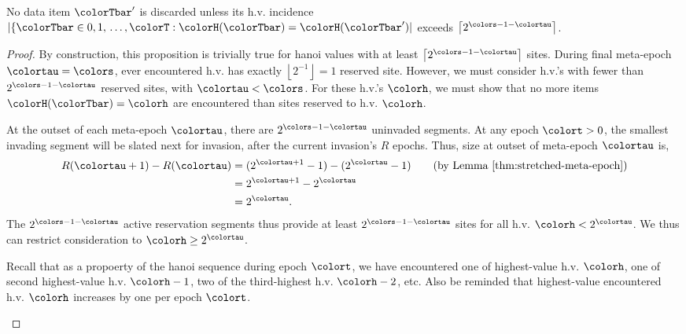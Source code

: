 \begin{lemma}
\label{thm:stretched-discarded-incidence-count}
No data item $\colorTbar'$ is discarded unless its h.v. incidence $|\{\colorTbar \in 0,1,\,\ldots,\colorT : \colorH(\colorTbar) = \colorH(\colorTbar')|$ exceeds $\left\lceil2^{\colors - 1 - \colortau}\right\rceil$.
\end{lemma}

\begin{proof}
By construction, this proposition is trivially true for hanoi values with at least $\left\lceil 2^{\colors-1-\colortau} \right\rceil$ sites.
During final meta-epoch $\colortau = \colors$, ever encountered h.v. has exactly $\left\lfloor 2^{-1} \right\rfloor = 1$ reserved site.
However, we must consider h.v.'s with fewer than $2^{\colors-1-\colortau}$ reserved sites, with $\colortau < \colors$.
For these h.v.'s $\colorh$, we must show that no more items $\colorH(\colorTbar) = \colorh$ are encountered than sites reserved to h.v. $\colorh$.

\begin{proofpart}

At the outset of each meta-epoch $\colortau$, there are $2^{\colors - 1 - \colortau}$ uninvaded segments.
At any epoch $\colort>0$, the smallest invading segment will be slated next for invasion, after the current invasion's $R$ epochs.
Thus, size at outset of meta-epoch $\colortau$ is,
\begin{align*}
R(\colortau + 1) - R(\colortau)
&= (2^{\colortau + 1} - 1) - (2^{\colortau} - 1) \tag{by Lemma \ref{thm:stretched-meta-epoch}}\\
&= 2^{\colortau + 1} - 2^{\colortau}\\
&= 2^{\colortau}.
\end{align*}
The $2^{\colors - 1 - \colortau}$ active reservation segments thus provide at least $2^{\colors - 1 - \colortau}$ sites for all h.v. $\colorh < 2^{\colortau}$.
We thus can restrict consideration to $\colorh \geq 2^{\colortau}$.
\end{proofpart}

\begin{proofpart}
Recall that as a propoerty of the hanoi sequence during epoch $\colort$, we have encountered one of highest-value h.v. $\colorh$, one of second highest-value h.v. $\colorh-1$, two of the third-highest h.v. $\colorh-2$, etc.
Also be reminded that highest-value encountered h.v. $\colorh$ increases by one per epoch $\colort$.


\end{proofpart}
\end{proof}
